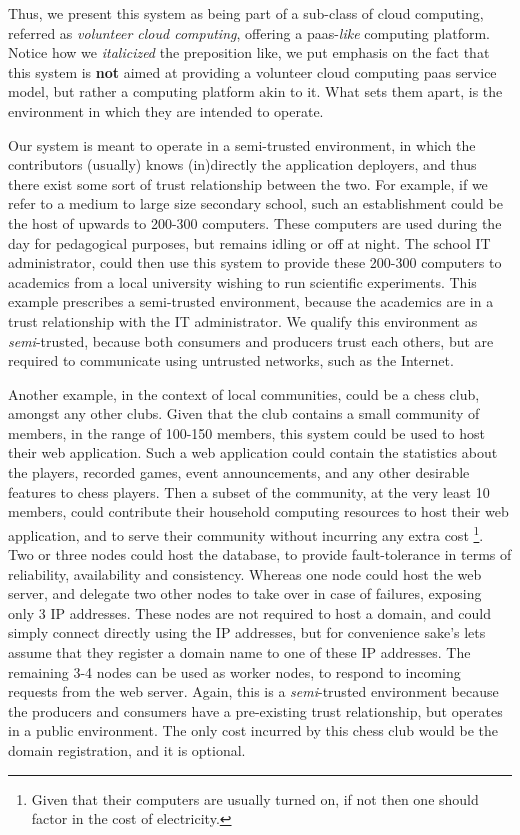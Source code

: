 \documentclass[12pt, titlepage]{uo_temp}
\begin{document}
     Thus, we present this system as being part of a sub-class of cloud computing,
     referred as \emph{volunteer cloud computing}, offering a \gls{paas}-\emph{like} computing
     platform. Notice how we \emph{italicized} the preposition like, we put emphasis on
     the fact that this system is \textbf{not} aimed at providing a volunteer cloud
     computing \gls{paas} service model, but rather a computing platform akin to it. What
     sets them apart, is the environment in which they are intended to operate. 
     
     Our system is meant to operate in a semi-trusted environment, in which the
     contributors (usually) knows (in)directly the application deployers, and thus there
     exist some sort of trust relationship between the two. For example, if we refer to a
     medium to large size secondary school, such an establishment could be the host of
     upwards to 200-300 computers. These computers are used during the day for pedagogical
     purposes, but remains idling or off at night. The school IT administrator, could then
     use this system to provide these 200-300 computers to academics from a local
     university wishing to run scientific experiments. This example prescribes a
     semi-trusted environment, because the academics are in a trust relationship with the
     IT administrator. We qualify this environment as \emph{semi}-trusted, because both
     consumers and producers trust each others, but are required to communicate using
     untrusted networks, such as the Internet.

     Another example, in the context of local communities, could be a chess club, amongst
     any other clubs. Given that the club contains a small community of members, in the
     range of 100-150 members, this system could be used to host their web
     application. Such a web application could contain the statistics about the players,
     recorded games, event announcements, and any other desirable features to chess
     players. Then a subset of the community, at the very least 10 members, could
     contribute their household computing resources to host their web application, and to
     serve their community without incurring any extra cost \footnote{Given that their
       computers are usually turned on, if not then one should factor in the cost of
       electricity.}. Two or three nodes could host the database, to provide
     fault-tolerance in terms of reliability, availability and consistency. Whereas one
     node could host the web server, and delegate two other nodes to take over in case of
     failures, exposing only 3 IP addresses. These nodes are not required to host a
     domain, and could simply connect directly using the IP addresses, but for convenience
     sake's lets assume that they register a domain name to one of these IP addresses. The
     remaining 3-4 nodes can be used as worker nodes, to respond to incoming requests from
     the web server. Again, this is a \emph{semi}-trusted environment because the
     producers and consumers have a pre-existing trust relationship, but operates in a
     public environment. The only cost incurred by this chess club would be the domain
     registration, and it is optional.
     
\end{document}
